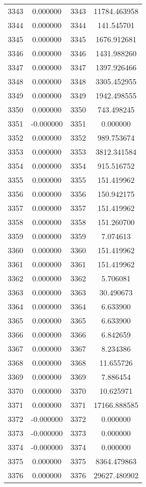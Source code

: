 \documentclass[12pt]{article}
\begin{document}
\begin{longtable}{@{}cccc@{}}
3343 & 0.000000 & 3343 & 11784.463958 \\
3344 & 0.000000 & 3344 & 141.545701 \\
3345 & 0.000000 & 3345 & 1676.912681 \\
3346 & 0.000000 & 3346 & 1431.988260 \\
3347 & 0.000000 & 3347 & 1397.926466 \\
3348 & 0.000000 & 3348 & 3305.452955 \\
3349 & 0.000000 & 3349 & 1942.498555 \\
3350 & 0.000000 & 3350 & 743.498245 \\
3351 & -0.000000 & 3351 & 0.000000 \\
3352 & 0.000000 & 3352 & 989.753674 \\
3353 & 0.000000 & 3353 & 3812.341584 \\
3354 & 0.000000 & 3354 & 915.516752 \\
3355 & 0.000000 & 3355 & 151.419962 \\
3356 & 0.000000 & 3356 & 150.942175 \\
3357 & 0.000000 & 3357 & 151.419962 \\
3358 & 0.000000 & 3358 & 151.260700 \\
3359 & 0.000000 & 3359 & 7.074613 \\
3360 & 0.000000 & 3360 & 151.419962 \\
3361 & 0.000000 & 3361 & 151.419962 \\
3362 & 0.000000 & 3362 & 5.706081 \\
3363 & 0.000000 & 3363 & 30.490673 \\
3364 & 0.000000 & 3364 & 6.633900 \\
3365 & 0.000000 & 3365 & 6.633900 \\
3366 & 0.000000 & 3366 & 6.842659 \\
3367 & 0.000000 & 3367 & 8.234386 \\
3368 & 0.000000 & 3368 & 11.655726 \\
3369 & 0.000000 & 3369 & 7.886454 \\
3370 & 0.000000 & 3370 & 10.625971 \\
3371 & 0.000000 & 3371 & 17166.888585 \\
3372 & -0.000000 & 3372 & 0.000000 \\
3373 & -0.000000 & 3373 & 0.000000 \\
3374 & -0.000000 & 3374 & 0.000000 \\
3375 & 0.000000 & 3375 & 8364.479863 \\
3376 & 0.000000 & 3376 & 29627.480902 \\

\end{longtable}
\end{document}
